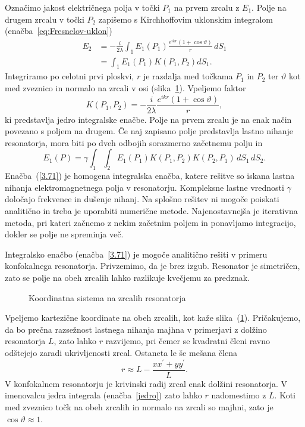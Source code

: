 Označimo jakost električnega polja v točki $P_{1}$ na prvem zrcalu z $E_{1}$.
Polje na drugem zrcalu v točki $P_2$ zapišemo s Kirchhoffovim uklonskim
integralom (enačba~\ref{eq:Fresnelov-uklon})
\begin{align}
E_{2} &=  -\frac{i}{2\lambda}\int_{1}E_{1}(P_{1})\frac{e^{ikr}(1+\cos\vartheta)}{r}\, dS_{1} \\
 & =  \int_{1}E_{1}(P_{1})K(P_{1},P_{2})dS_{1}.
\label{eq:resuklon}
\end{align}
Integriramo po celotni prvi ploskvi, $r$ je razdalja med točkama $P_{1}$ in $P_{2}$ ter $\vartheta$
kot med zveznico in normalo na zrcali v osi (slika~\ref{fig:uklon_res_shema}). Vpeljemo faktor
\begin{equation}
K(P_{1},P_{2}) = -\frac{i}{2\lambda}\frac{e^{ikr}(1+\cos\vartheta)}{r},
\label{jedro}
\end{equation}
ki predstavlja jedro integralske enačbe. Polje na prvem zrcalu je 
na enak način povezano s poljem na drugem. Če naj zapisano polje predstavlja lastno nihanje
resonatorja, mora biti po dveh odbojih sorazmerno začetnemu polju in
\begin{equation}
E_{1}(P)=\gamma\int_{1}\int_{2}E_{1}(P_{1})K(P_{1},P_{2})K(P_{2},P_1)\, dS_{1}\, dS_{2}.
\label{3.71}
\end{equation}
Enačba~(\ref{3.71}) je homogena integralska enačba, katere
rešitve so iskana lastna nihanja elektromagnetnega polja v resonatorju.
Kompleksne lastne vrednosti $\gamma$ določajo frekvence in dušenje
nihanj. Na splošno rešitev ni mogoče poiskati analitično in treba je uporabiti 
numerične metode. Najenostavnejša je iterativna
metoda, pri kateri začnemo z nekim začetnim poljem in ponavljamo integracijo, 
dokler se polje ne spreminja več.

Integralsko enačbo (enačba~\ref{3.71}) je mogoče analitično rešiti v primeru
konfokalnega resonatorja. Privzemimo, da je brez izgub. 
Resonator je simetričen, zato se polje na obeh zrcalih lahko razlikuje kvečjemu
za predznak.
\begin{figure}[h]
\centering
\def\svgwidth{100truemm} 

\caption{Koordinatna sistema na zrcalih resonatorja}
\label{fig:uklon_res_shema}
\end{figure}

Vpeljemo kartezične koordinate na obeh zrcalih, kot kaže slika~(\ref{fig:uklon_res_shema}).
Pričakujemo, da bo prečna razsežnost lastnega nihanja majhna v primerjavi
z dolžino resonatorja $L$, zato lahko $r$ razvijemo, pri čemer se kvadratni členi ravno odštejejo 
zaradi ukrivljenosti zrcal. Ostaneta le še mešana člena
\begin{equation}
r\approx L-\frac{xx^{\prime}+yy^{\prime}}{L}.
\label{3.72}
\end{equation}
V konfokalnem resonatorju je krivinski radij zrcal enak dolžini resonatorja.
V imenovalcu jedra integrala (enačba~\ref{jedro}) zato lahko $r$ nadomestimo
z $L$. Koti med zveznico točk na obeh zrcalih in normalo na zrcali
so majhni, zato je  $\cos\vartheta \approx 1$. 

